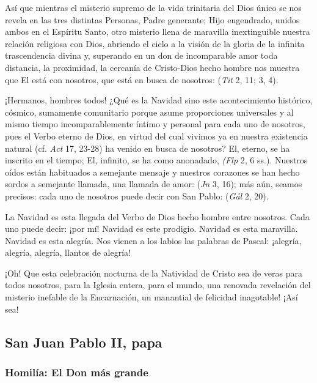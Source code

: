\begin{body}
\begin{body}
Así que mientras el misterio supremo de la vida trinitaria del Dios único se nos revela en las tres distintas Personas, Padre generante; Hijo engendrado, unidos ambos en el Espíritu Santo, otro misterio llena de maravilla inextinguible nuestra relación religiosa con Dios, abriendo el cielo a la visión de la gloria de la infinita trascendencia divina y, superando en un don de incomparable amor toda distancia, la proximidad, la cercanía de Cristo-Dios hecho hombre nos muestra que El está con nosotros, que está en busca de nosotros:  (\emph{Tit} 2, 11; 3, 4).

¡Hermanos, hombres todos! ¿Qué es la Navidad sino este acontecimiento histórico, cósmico, sumamente comunitario porque asume proporciones universales y al mismo tiempo incomparablemente íntimo y personal para cada uno de nosotros, pues el Verbo eterno de Dios, en virtud del cual vivimos ya en nuestra existencia natural (cf. \emph{Act} 17, 23-28) ha venido en busca de nosotros? El, eterno, se ha inscrito en el tiempo; El, infinito, se ha como anonadado,  \emph{(Flp} 2, 6 ss.). Nuestros oídos están habituados a semejante mensaje y nuestros corazones se han hecho sordos a semejante llamada, una llamada de amor:  (\emph{Jn} 3, 16); más aún, seamos precisos: cada uno de nosotros puede decir con San Pablo:  (\emph{Gál} 2, 20).

La Navidad es esta llegada del Verbo de Dios hecho hombre entre nosotros. Cada uno puede decir: ¡por mí! Navidad es este prodigio. Navidad es esta maravilla. Navidad es esta alegría. Nos vienen a los labios las palabras de Pascal: ¡alegría, alegría, alegría, llantos de alegría!

¡Oh! Que esta celebración nocturna de la Natividad de Cristo sea de veras para todos nosotros, para la Iglesia entera, para el mundo, una renovada revelación del misterio inefable de la Encarnación, un manantial de felicidad inagotable! ¡Así sea!

\subsection{San Juan Pablo II, papa}

\subsubsection{Homilía: El Don más grande}


\end{body}
\end{body}

